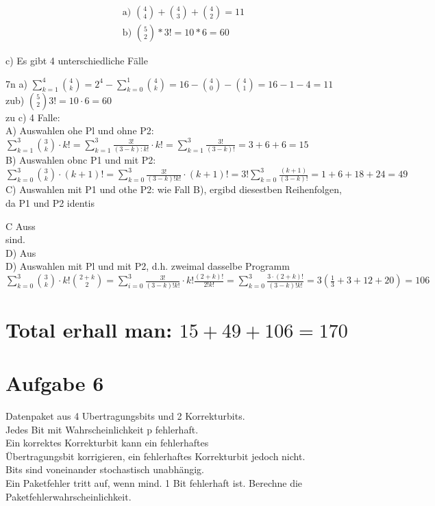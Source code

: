 \documentclass[10pt]{article}
\begin{document}
{$$
\begin{aligned}
& \text { a) }\binom{4}{4}+\binom{4}{3}+\binom{4}{2}=11 \\
& \text { b) }\binom{5}{2} * 3!=10 * 6=60
\end{aligned}
$$

c) Es gibt 4 unterschiedliche Fälle

7n a) $\sum_{k=1}^{4}\binom{4}{k}=2^{4}-\sum_{k=0}^{1}\binom{4}{k}=16-\binom{4}{0}-\binom{4}{1}=16-1-4=11$\\
zub) $\binom{5}{2} 3!=10 \cdot 6=60$\\
zu c) 4 Falle:\\
A) Auswahlen ohe Pl und ohne P2:\\
$\sum_{k=1}^{3}\binom{3}{k} \cdot k!=\sum_{k=1}^{3} \frac{3!}{(3-k): k!} \cdot k!=\sum_{k=1}^{3} \frac{3!}{(3-k)!}=3+6+6=15$\\
B) Auswahlen obnc P1 und mit P2:\\
$\sum_{k=0}^{3}\binom{3}{k} \cdot(k+1)!=\sum_{k=0}^{3} \frac{3!}{(3-k)!k!} \cdot(k+1)!=3!\sum_{k=0}^{3} \frac{(k+1)}{(3-k)!}=1+6+18+24=49$\\
C) Auswahlen mit P1 und othe P2: wie Fall B), ergibd diesestben Reihenfolgen, da P1 und P2 identis

C Auss\\
sind.\\
D) Aus\\
D) Auswahlen mit Pl und mit P2, d.h. zweimal dasselbe Programm\\
$\sum_{k=0}^{3}\binom{3}{k} \cdot k!\binom{2+k}{2}=\sum_{i=0}^{3} \frac{3!}{(3-k)!k!} \cdot k!\frac{(2+k)!}{2!k!}=\sum_{k=0}^{3} \frac{3 \cdot(2+k)!}{(3-k)!k!}=3\left(\frac{1}{3}+3+12+20\right)=106$

\section*{Total erhall man: $15+49+106=170$}
\section*{Aufgabe 6}
Datenpaket aus 4 Ubertragungsbits und 2 Korrekturbits.\\
Jedes Bit mit Wahrscheinlichkeit p fehlerhaft.\\
Ein korrektes Korrekturbit kann ein fehlerhaftes\\
Übertragungsbit korrigieren, ein fehlerhaftes Korrekturbit jedoch nicht.\\
Bits sind voneinander stochastisch unabhängig.\\
Ein Paketfehler tritt auf, wenn mind. 1 Bit fehlerhaft ist. Berechne die Paketfehlerwahrscheinlichkeit.

}
\end{document}

